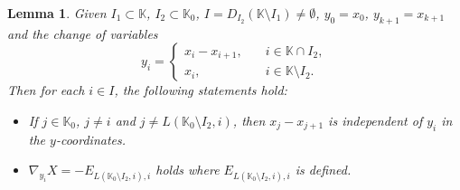 \documentclass[11pt,reqno]{amsart}
\newtheorem{lemma}[theorem]{Lemma}
\numberwithin{equation}{section}
\theoremstyle{definition}
\begin{document}
\begin{lemma}\label{lmchangeofvariables}
	Given $I_1\subset\mathbb{K}$, $I_2\subset\mathbb{K}_0$, $I=D_{I_2}(\mathbb{K}\setminus I_1)\neq\emptyset$, $y_0=x_0$, $y_{k+1}=x_{k+1}$ and the change of variables
	\begin{equation*}
		y_i=\begin{cases}
			x_i-x_{i+1},\quad&i\in\mathbb{K}\cap I_2,\\
			x_i,&i\in\mathbb{K}\setminus I_2.
		\end{cases}
	\end{equation*}
	Then for each $i\in I$, the following statements hold:
	\begin{itemize}
		\item [1)] If $j\in\mathbb{K}_0$, $j\neq i$ and $j\neq L(\mathbb{K}_0\setminus I_2,i)$, then $x_j-x_{j+1}$ is independent of $y_i$ in the $y$-coordinates.
		
		\item [2)] $\nabla_{y_i}X=-E_{L(\mathbb{K}_0\setminus I_2,i),i}$ holds where $E_{L(\mathbb{K}_0\setminus I_2,i),i}$ is defined.
	\end{itemize}
\end{lemma}
\end{document}
